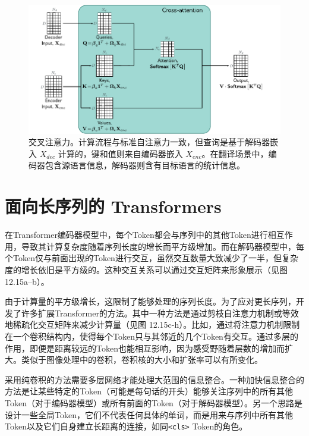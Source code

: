 \documentclass[lang=cn,newtx,10pt,scheme=chinese]{elegantbook}
\begin{document}
\begin{figure}[ht!]
\centering
\includegraphics[width=0.7\linewidth]{PDFFigures/UDLChap12PDF/TransformerBlockSACross.pdf}
\caption{交叉注意力。计算流程与标准自注意力一致，但查询是基于解码器嵌入 \(X_{dec}\) 计算的，键和值则来自编码器嵌入 \(X_{enc}\)。在翻译场景中，编码器包含源语言信息，解码器则含有目标语言的统计信息。}
\end{figure}

\section{面向长序列的 Transformers}
在Transformer编码器模型中，每个Token都会与序列中的其他Token进行相互作用，导致其计算复杂度随着序列长度的增长而平方级增加。而在解码器模型中，每个Token仅与前面出现的Token进行交互，虽然交互数量大致减少了一半，但复杂度的增长依旧是平方级的。这种交互关系可以通过交互矩阵来形象展示（见图 12.15a–b）。

由于计算量的平方级增长，这限制了能够处理的序列长度。为了应对更长序列，开发了许多扩展Transformer的方法。其中一种方法是通过剪枝自注意力机制或等效地稀疏化交互矩阵来减少计算量（见图 12.15c-h）。比如，通过将注意力机制限制在一个卷积结构内，使得每个Token只与其邻近的几个Token有交互。通过多层的作用，即便是距离较远的Token也能相互影响，因为感受野随着层数的增加而扩大。类似于图像处理中的卷积，卷积核的大小和扩张率可以有所变化。

采用纯卷积的方法需要多层网络才能处理大范围的信息整合。一种加快信息整合的方法是让某些特定的Token（可能是每句话的开头）能够关注序列中的所有其他Token（对于编码器模型）或所有前面的Token（对于解码器模型）。另一个思路是设计一些全局Token，它们不代表任何具体的单词，而是用来与序列中所有其他Token以及它们自身建立长距离的连接，如同\texttt{\textless cls\textgreater} Token的角色。
\end{document}
